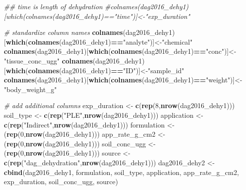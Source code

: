 \documentclass[
]{article}
\newenvironment{Shaded}{\begin{snugshade}}{\end{snugshade}}
\newcommand{\CommentTok}[1]{\textcolor[rgb]{0.56,0.35,0.01}{\textit{#1}}}
\newcommand{\DecValTok}[1]{\textcolor[rgb]{0.00,0.00,0.81}{#1}}
\newcommand{\KeywordTok}[1]{\textcolor[rgb]{0.13,0.29,0.53}{\textbf{#1}}}
\newcommand{\NormalTok}[1]{#1}
\newcommand{\OperatorTok}[1]{\textcolor[rgb]{0.81,0.36,0.00}{\textbf{#1}}}
\newcommand{\StringTok}[1]{\textcolor[rgb]{0.31,0.60,0.02}{#1}}
\begin{document}
\begin{Shaded}
\begin{Highlighting}[]
\CommentTok{## time is length of dehydration}
\CommentTok{#colnames(dag2016_dehy1)[which(colnames(dag2016_dehy1)=="time")]<-"exp_duration"}

\CommentTok{# standardize column names}
\KeywordTok{colnames}\NormalTok{(dag2016_dehy1)[}\KeywordTok{which}\NormalTok{(}\KeywordTok{colnames}\NormalTok{(dag2016_dehy1)}\OperatorTok{==}\StringTok{"analyte"}\NormalTok{)]<-}\StringTok{"chemical"}
\KeywordTok{colnames}\NormalTok{(dag2016_dehy1)[}\KeywordTok{which}\NormalTok{(}\KeywordTok{colnames}\NormalTok{(dag2016_dehy1)}\OperatorTok{==}\StringTok{"conc"}\NormalTok{)]<-}\StringTok{"tissue_conc_ugg"}
\KeywordTok{colnames}\NormalTok{(dag2016_dehy1)[}\KeywordTok{which}\NormalTok{(}\KeywordTok{colnames}\NormalTok{(dag2016_dehy1)}\OperatorTok{==}\StringTok{"ID"}\NormalTok{)]<-}\StringTok{"sample_id"}
\KeywordTok{colnames}\NormalTok{(dag2016_dehy1)[}\KeywordTok{which}\NormalTok{(}\KeywordTok{colnames}\NormalTok{(dag2016_dehy1)}\OperatorTok{==}\StringTok{"weight"}\NormalTok{)]<-}\StringTok{"body_weight_g"}

\CommentTok{# add additional columns}
\NormalTok{exp_duration <-}\StringTok{ }\KeywordTok{c}\NormalTok{(}\KeywordTok{rep}\NormalTok{(}\DecValTok{8}\NormalTok{,}\KeywordTok{nrow}\NormalTok{(dag2016_dehy1)))}
\NormalTok{soil_type <-}\StringTok{ }\KeywordTok{c}\NormalTok{(}\KeywordTok{rep}\NormalTok{(}\StringTok{"PLE"}\NormalTok{,}\KeywordTok{nrow}\NormalTok{(dag2016_dehy1)))}
\NormalTok{application <-}\StringTok{ }\KeywordTok{c}\NormalTok{(}\KeywordTok{rep}\NormalTok{(}\StringTok{"Indirect"}\NormalTok{,}\KeywordTok{nrow}\NormalTok{(dag2016_dehy1)))}
\NormalTok{formulation <-}\StringTok{ }\NormalTok{(}\KeywordTok{rep}\NormalTok{(}\DecValTok{0}\NormalTok{,}\KeywordTok{nrow}\NormalTok{(dag2016_dehy1)))}
\NormalTok{app_rate_g_cm2 <-}\StringTok{ }\NormalTok{(}\KeywordTok{rep}\NormalTok{(}\DecValTok{0}\NormalTok{,}\KeywordTok{nrow}\NormalTok{(dag2016_dehy1)))}
\NormalTok{soil_conc_ugg <-}\StringTok{ }\NormalTok{(}\KeywordTok{rep}\NormalTok{(}\DecValTok{0}\NormalTok{,}\KeywordTok{nrow}\NormalTok{(dag2016_dehy1)))}
\NormalTok{source <-}\StringTok{ }\KeywordTok{c}\NormalTok{(}\KeywordTok{rep}\NormalTok{(}\StringTok{"dag_dehydration"}\NormalTok{,}\KeywordTok{nrow}\NormalTok{(dag2016_dehy1)))}
\NormalTok{dag2016_dehy2 <-}\StringTok{ }\KeywordTok{cbind}\NormalTok{(dag2016_dehy1, formulation, soil_type, application, }
\NormalTok{                       app_rate_g_cm2, exp_duration, soil_conc_ugg, source)}
\end{Highlighting}
\end{Shaded}
\end{document}
